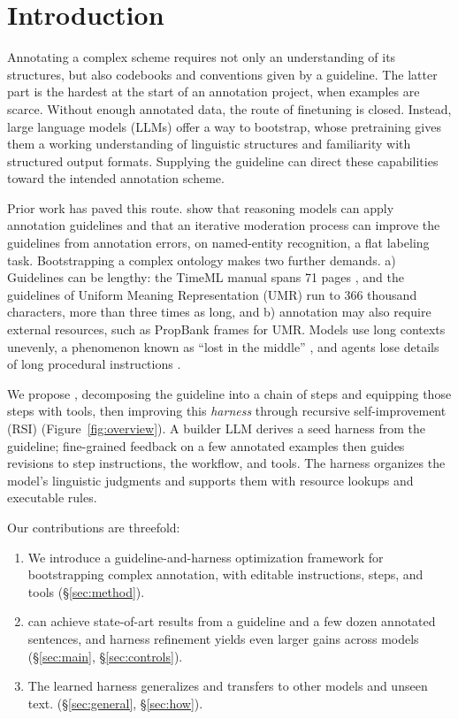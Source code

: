 \section{Introduction}
\label{sec:intro}

Annotating a complex scheme requires not only an understanding of its structures, but also codebooks and conventions given by a guideline. The latter part is the hardest at the start of an annotation project, when examples are scarce. Without enough annotated data, the route of finetuning is closed. Instead, large language models (LLMs) offer a way to bootstrap, whose pretraining gives them a working understanding of linguistic structures and familiarity with structured output formats. Supplying the guideline can direct these capabilities toward the intended annotation scheme.

Prior work has paved this route. \citet{kim2026refining} show that reasoning models can apply annotation guidelines and that an iterative moderation process can improve the guidelines from annotation errors, on named-entity recognition, a flat labeling task. Bootstrapping a complex ontology makes two further demands. a) Guidelines can be lengthy: the TimeML manual spans 71 pages \citep{sauri2006timeml}, and the guidelines of Uniform Meaning Representation (UMR) \citep{vangysel2021designing, bonn2024building} run to 366 thousand characters, more than three times as long, and b) annotation may also require external resources, such as PropBank frames \citep{palmer2005propbank} for UMR. Models use long contexts unevenly, a phenomenon known as ``lost in the middle'' \citep{liu2024lost}, and agents lose details of long procedural instructions \citep{panavas2026handbook}.

We propose \sys, decomposing the guideline into a chain of steps and equipping those steps with tools, then improving this \emph{harness} through recursive self-improvement (RSI) (Figure~\ref{fig:overview}). A builder LLM derives a seed harness from the guideline; fine-grained feedback on a few annotated examples then guides revisions to step instructions, the workflow, and tools. The harness organizes the model's linguistic judgments and supports them with resource lookups and executable rules.

Our contributions are threefold:
\begin{enumerate}[leftmargin=*,itemsep=1pt,topsep=2pt]
  \item We introduce a guideline-and-harness optimization framework for bootstrapping complex annotation, with editable instructions, steps, and tools (\S\ref{sec:method}).
  \item \sys can achieve state-of-art results from a guideline and a few dozen annotated sentences, and harness refinement yields even larger gains across models (\S\ref{sec:main}, \S\ref{sec:controls}).
  \item The learned harness generalizes and transfers to other models and unseen text. (\S\ref{sec:general}, \S\ref{sec:how}).
\end{enumerate}
